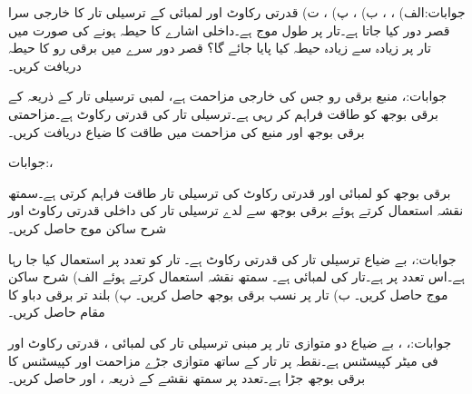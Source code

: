 جوابات:الف) ، ،  ب) ،  پ) ،  ت) 
قدرتی رکاوٹ  اور لمبائی  کے ترسیلی تار کا خارجی سرا قصر دور کیا جاتا ہے۔تار پر طول موج  ہے۔داخلی اشارے کا حیطہ  ہونے کی صورت میں تار پر زیادہ سے زیادہ حیطہ کیا پایا جائے گا؟ قصر دور سرے میں برقی رو کا حیطہ دریافت کریں۔

جوابات:، 
منبع برقی رو  جس کی خارجی مزاحمت  ہے،  لمبی ترسیلی تار کے ذریعہ  کے برقی بوجھ کو طاقت فراہم کر رہی ہے۔ترسیلی تار کی قدرتی رکاوٹ  ہے۔مزاحمتی برقی بوجھ اور منبع کی مزاحمت میں طاقت کا ضیاع دریافت کریں۔

جوابات:، 

برقی بوجھ  کو  لمبائی اور  قدرتی رکاوٹ کی ترسیلی تار طاقت فراہم کرتی ہے۔سمتھ نقشہ استعمال کرتے ہوئے برقی بوجھ سے لدے  ترسیلی تار کی داخلی قدرتی رکاوٹ  اور شرح ساکن موج  حاصل کریں۔

جوابات:، 
بے ضیاع ترسیلی تار کی قدرتی رکاوٹ   ہے۔ تار کو  تعدد پر استعمال کیا جا رہا ہے۔اس
 تعدد پر  ہے۔تار کی لمبائی  ہے۔ سمتھ نقشہ استعمال کرتے ہوئے  الف) شرح ساکن موج حاصل کریں۔ ب) تار پر نسب برقی بوجھ  حاصل کریں۔ پ) بلند تر برقی دباو کا مقام حاصل کریں۔

جوابات:، ، 
بے ضیاع دو متوازی تار پر مبنی ترسیلی تار کی لمبائی ، قدرتی رکاوٹ  اور فی میٹر کپیسٹنس  ہے۔نقطہ  پر تار کے ساتھ متوازی جڑے مزاحمت  اور کپیسٹنس  کا برقی بوجھ جڑا ہے۔تعدد  پر سمتھ نقشے کے ذریعہ ،  اور  حاصل کریں۔

